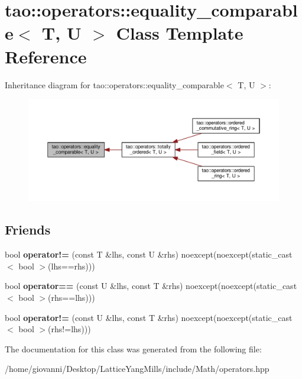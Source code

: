 \hypertarget{classtao_1_1operators_1_1equality__comparable}{}\section{tao\+:\+:operators\+:\+:equality\+\_\+comparable$<$ T, U $>$ Class Template Reference}
\label{classtao_1_1operators_1_1equality__comparable}


Inheritance diagram for tao\+:\+:operators\+:\+:equality\+\_\+comparable$<$ T, U $>$\+:\nopagebreak
\begin{figure}[H]
\begin{center}
\leavevmode
\includegraphics[width=350pt]{classtao_1_1operators_1_1equality__comparable__inherit__graph}
\end{center}
\end{figure}
\subsection*{Friends}
\begin{DoxyCompactItemize}
\item 
bool {\bfseries operator!=} (const T \&lhs, const U \&rhs) noexcept(noexcept(static\+\_\+cast$<$ bool $>$(lhs==rhs)))\hypertarget{classtao_1_1operators_1_1equality__comparable_aa604dde0cd4207e46cdb19f54a3e6427}{}\label{classtao_1_1operators_1_1equality__comparable_aa604dde0cd4207e46cdb19f54a3e6427}

\item 
bool {\bfseries operator==} (const U \&lhs, const T \&rhs) noexcept(noexcept(static\+\_\+cast$<$ bool $>$(rhs==lhs)))\hypertarget{classtao_1_1operators_1_1equality__comparable_aa5e9b95f8b1a0f6dc161a7c5d9be836d}{}\label{classtao_1_1operators_1_1equality__comparable_aa5e9b95f8b1a0f6dc161a7c5d9be836d}

\item 
bool {\bfseries operator!=} (const U \&lhs, const T \&rhs) noexcept(noexcept(static\+\_\+cast$<$ bool $>$(rhs!=lhs)))\hypertarget{classtao_1_1operators_1_1equality__comparable_a232a4bf2110a01f2681fc9a55b6748f7}{}\label{classtao_1_1operators_1_1equality__comparable_a232a4bf2110a01f2681fc9a55b6748f7}

\end{DoxyCompactItemize}


The documentation for this class was generated from the following file\+:\begin{DoxyCompactItemize}
\item 
/home/giovanni/\+Desktop/\+Lattice\+Yang\+Mills/include/\+Math/operators.\+hpp\end{DoxyCompactItemize}
